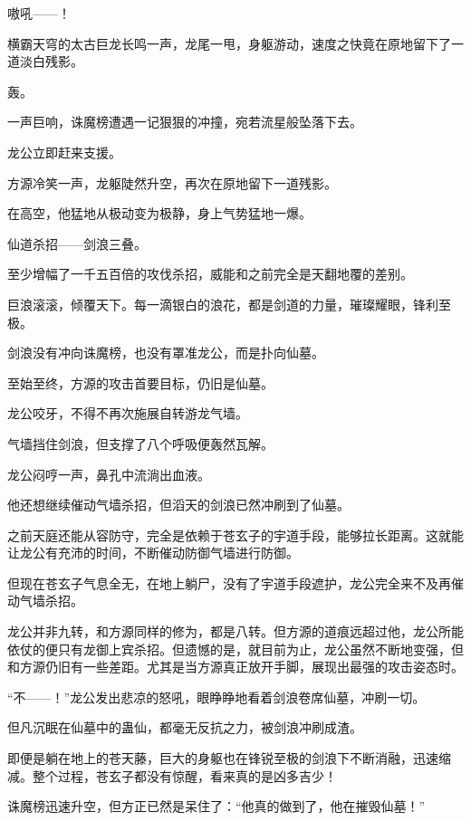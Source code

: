 
\begin{this_body}

嗷吼——！

横霸天穹的太古巨龙长鸣一声，龙尾一甩，身躯游动，速度之快竟在原地留下了一道淡白残影。

轰。

一声巨响，诛魔榜遭遇一记狠狠的冲撞，宛若流星般坠落下去。

龙公立即赶来支援。

方源冷笑一声，龙躯陡然升空，再次在原地留下一道残影。

在高空，他猛地从极动变为极静，身上气势猛地一爆。

仙道杀招——剑浪三叠。

至少增幅了一千五百倍的攻伐杀招，威能和之前完全是天翻地覆的差别。

巨浪滚滚，倾覆天下。每一滴银白的浪花，都是剑道的力量，璀璨耀眼，锋利至极。

剑浪没有冲向诛魔榜，也没有罩准龙公，而是扑向仙墓。

至始至终，方源的攻击首要目标，仍旧是仙墓。

龙公咬牙，不得不再次施展自转游龙气墙。

气墙挡住剑浪，但支撑了八个呼吸便轰然瓦解。

龙公闷哼一声，鼻孔中流淌出血液。

他还想继续催动气墙杀招，但滔天的剑浪已然冲刷到了仙墓。

之前天庭还能从容防守，完全是依赖于苍玄子的宇道手段，能够拉长距离。这就能让龙公有充沛的时间，不断催动防御气墙进行防御。

但现在苍玄子气息全无，在地上躺尸，没有了宇道手段遮护，龙公完全来不及再催动气墙杀招。

龙公并非九转，和方源同样的修为，都是八转。但方源的道痕远超过他，龙公所能依仗的便只有龙御上宾杀招。但遗憾的是，就目前为止，龙公虽然不断地变强，但和方源仍旧有一些差距。尤其是当方源真正放开手脚，展现出最强的攻击姿态时。

“不——！”龙公发出悲凉的怒吼，眼睁睁地看着剑浪卷席仙墓，冲刷一切。

但凡沉眠在仙墓中的蛊仙，都毫无反抗之力，被剑浪冲刷成渣。

即便是躺在地上的苍天藤，巨大的身躯也在锋锐至极的剑浪下不断消融，迅速缩减。整个过程，苍玄子都没有惊醒，看来真的是凶多吉少！

诛魔榜迅速升空，但方正已然是呆住了：“他真的做到了，他在摧毁仙墓！”


\end{this_body}
